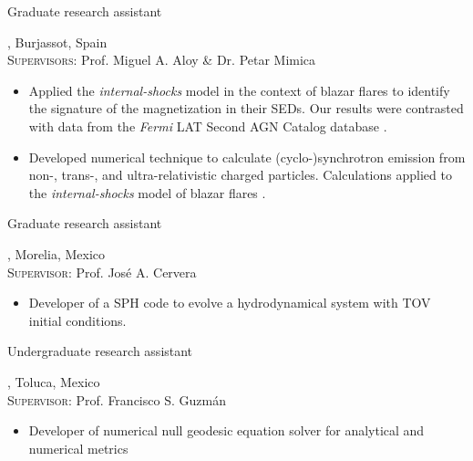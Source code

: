 %
{\DAAval}{Graduate research assistant}%
{}%
{}%
{\UVval, Burjassot, Spain\\%
  \textsc{Supervisors}: Prof. Miguel A. Aloy \& Dr. Petar Mimica
  \begin{itemize}
    \item Applied the \emph{internal-shocks} model in the context of blazar flares to identify the signature of the magnetization in their SEDs. Our results were contrasted with data from the \emph{Fermi} LAT Second AGN Catalog database \cite{RuedaBecerril:2014mi}.
    \item Developed numerical technique to calculate (cyclo-)synchrotron emission from non-, trans-, and ultra-relativistic charged particles. Calculations applied to the \emph{internal-shocks} model of blazar flares \cite{RuedaBecerril:2017mi}.
  \end{itemize}
}
%
{\IFMes}{Graduate research assistant}%
{}%
{}%
{\UMSNHes, Morelia, Mexico\\%
  \textsc{Supervisor}: Prof. José A. Cervera
  \begin{itemize}
    \item Developer of a SPH code to evolve a hydrodynamical system with TOV initial conditions.
  \end{itemize}
}
%
{\FCes}{Undergraduate research assistant}%
{}%
{}%
{\UAEMes, Toluca, Mexico\\%
  \textsc{Supervisor}: Prof. Francisco S. Guzmán
  \begin{itemize}
    \item Developer of numerical null geodesic equation solver for analytical and numerical metrics \cite{Guzman:2009ru}
  \end{itemize}
}
